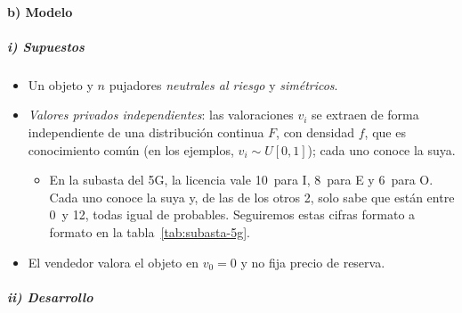 \documentclass[11pt]{article}
\begin{document}
\paragraph{b) Modelo}

\subparagraph{i) Supuestos}

\begin{itemize}
\item Un objeto y $n$ pujadores \emph{neutrales al riesgo} y \emph{simétricos}.
\item \emph{Valores privados independientes}: las valoraciones $v_i$ se extraen de forma independiente de una distribución continua $F$, con densidad $f$, que es conocimiento común (en los ejemplos, $v_i\sim U[0,1]$); cada uno conoce la suya.
  \begin{itemize}
  \item En la subasta del 5G, la licencia vale 10~para \textup{I}, 8~para E y 6~para O. Cada uno conoce la suya y, de las de los otros 2, solo sabe que están entre 0~y 12, todas igual de probables. Seguiremos estas cifras formato a formato en la tabla~\ref{tab:subasta-5g}.
  \end{itemize}
\item El vendedor valora el objeto en $v_0=0$ y no fija precio de reserva.
\end{itemize}

\subparagraph{ii) Desarrollo}
\end{document}
